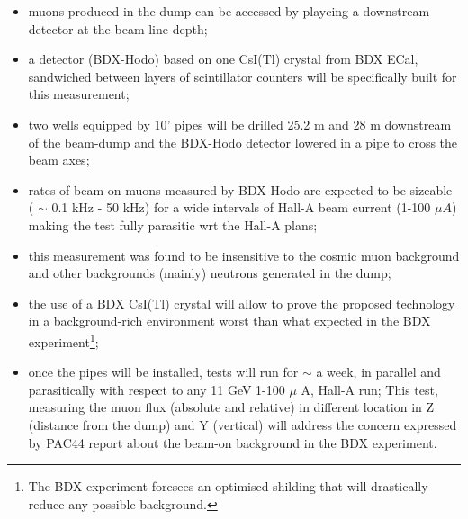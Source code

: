 \begin{itemize}
\item{muons produced in the dump can be accessed by playcing a downstream detector  at the beam-line depth;}
\item{a detector  (BDX-Hodo) based on one CsI(Tl) crystal from  BDX ECal, sandwiched between layers of scintillator counters  will be specifically built for this measurement;}
\item{ two wells equipped by  10' pipes will be drilled  25.2 m and 28 m downstream of the beam-dump and the BDX-Hodo detector lowered in a pipe to cross the beam axes;}
\item{rates of beam-on muons measured by BDX-Hodo are expected  to be sizeable ( $\sim$ 0.1 kHz - 50 kHz) for a wide intervals of  Hall-A beam current (1-100 $\mu A$) making the test fully parasitic wrt the Hall-A plans;}
\item{this measurement was found to be insensitive to the cosmic muon background and other backgrounds (mainly) neutrons generated in the dump; }
\item{the use of a BDX CsI(Tl) crystal will allow to prove the proposed technology in a background-rich environment worst than what expected in the BDX experiment\footnote{The BDX experiment foresees  an optimised shilding that will drastically reduce  any possible background.}; }
\item{once the pipes will be installed, tests will run for $\sim$ a week, in parallel and parasitically  with respect to  any 11 GeV 1-100 $\mu$ A, Hall-A run;} 
This  test, measuring the muon flux (absolute and relative) in different location in Z (distance from the dump) and Y (vertical) will address the concern expressed by PAC44 report about the beam-on background in the BDX experiment.
\end{itemize}

